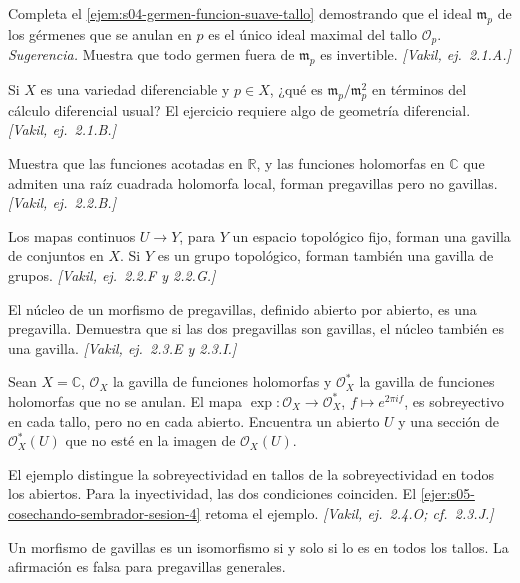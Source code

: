 \begin{ejer}
\label{ejer:s04-ejemplo-funciones-suaves-demuestra-ideal}
Completa el \cref{ejem:s04-germen-funcion-suave-tallo} demostrando que el ideal $\mathfrak m_p$ de los gérmenes que se anulan en $p$ es el único ideal maximal del tallo $\mathcal O_p$.
\emph{Sugerencia.} Muestra que todo germen fuera de $\mathfrak m_p$ es invertible. \emph{[Vakil, ej.~2.1.A.]}
\end{ejer}
\begin{ejer}
\label{ejer:s04-x-variedad-diferenciable-p-x}
Si $X$ es una variedad diferenciable y $p\in X$, ¿qué es $\mathfrak m_p/\mathfrak m_p^2$ en términos del cálculo diferencial usual? El ejercicio requiere algo de geometría diferencial. \emph{[Vakil, ej.~2.1.B.]}
\end{ejer}
\begin{ejer}
\label{ejer:s04-muestra-funciones-acotadas-r-funciones}
Muestra que las funciones acotadas en $\mathbb R$, y las funciones holomorfas en $\mathbb C$ que admiten una raíz cuadrada holomorfa local, forman pregavillas pero no gavillas. \emph{[Vakil, ej.~2.2.B.]}
\end{ejer}
\begin{ejer}
\label{ejer:s04-mapas-continuos-u-espacio-topologico}
Los mapas continuos $U\to Y$, para $Y$ un espacio topológico fijo, forman una gavilla de conjuntos en $X$. Si $Y$ es un grupo topológico, forman también una gavilla de grupos. \emph{[Vakil, ej.~2.2.F y 2.2.G.]}
\end{ejer}
\begin{ejer}
\label{ejer:s04-nucleo-morfismo-pregavillas-definido-abierto}
El núcleo de un morfismo de pregavillas, definido abierto por abierto, es una pregavilla. Demuestra que si las dos pregavillas son gavillas, el núcleo también es una gavilla. \emph{[Vakil, ej.~2.3.E y 2.3.I.]}
\end{ejer}
\begin{ejer}
\label{ejer:s04-sean-x-c-o-x}
Sean $X=\mathbb C$, $\mathcal O_X$ la gavilla de funciones holomorfas y $\mathcal O_X^*$ la gavilla de funciones holomorfas que no se anulan. El mapa $\exp\colon \mathcal O_X\to\mathcal O_X^*$, $f\mapsto e^{2\pi if}$, es sobreyectivo en cada tallo, pero no en cada abierto. Encuentra un abierto $U$ y una sección de $\mathcal O_X^*(U)$ que no esté en la imagen de $\mathcal O_X(U)$.

El ejemplo distingue la sobreyectividad en tallos de la sobreyectividad en todos los abiertos. Para la inyectividad, las dos condiciones coinciden. El \cref{ejer:s05-cosechando-sembrador-sesion-4} retoma el ejemplo. \emph{[Vakil, ej.~2.4.O; cf.~2.3.J.]}
\end{ejer}
\begin{ejer}
\label{ejer:s04-pensar-no-demuestra-clase}
Un morfismo de gavillas es un isomorfismo si y solo si lo es en todos los tallos. La afirmación es falsa para pregavillas generales.
\end{ejer}

